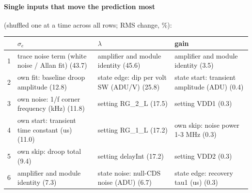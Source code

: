 \paragraph{Single inputs that move the prediction most} (shuffled one at a time across all rows; RMS change, \%):
\begin{center}\footnotesize
\begin{tabular}{rp{}p{}p{}}
\toprule
 & $\sigma_e$ & $\lambda$ & gain \\
\midrule
1 & trace noise term (white noise / Allan fit) (43.7) & amplifier and module identity (45.6) & amplifier and module identity (3.5) \\
2 & own fit: baseline droop amplitude (12.8) & state edge: dip per volt SW (ADU/V) (25.8) & state start: transient amplitude (ADU) (0.4) \\
3 & own noise: 1/f corner frequency (kHz) (11.8) & setting RG\_2\_L (17.5) & setting VDD1 (0.3) \\
4 & own start: transient time constant (us) (11.0) & setting RG\_1\_L (17.2) & own skip: noise power 1-3 MHz (0.3) \\
5 & own skip: droop total (9.4) & setting delayInt (17.2) & setting VDD2 (0.3) \\
6 & amplifier and module identity (7.3) & state noise: null-CDS noise (ADU) (6.7) & state edge: recovery tau1 (us) (0.3) \\
\bottomrule
\end{tabular}
\end{center}
